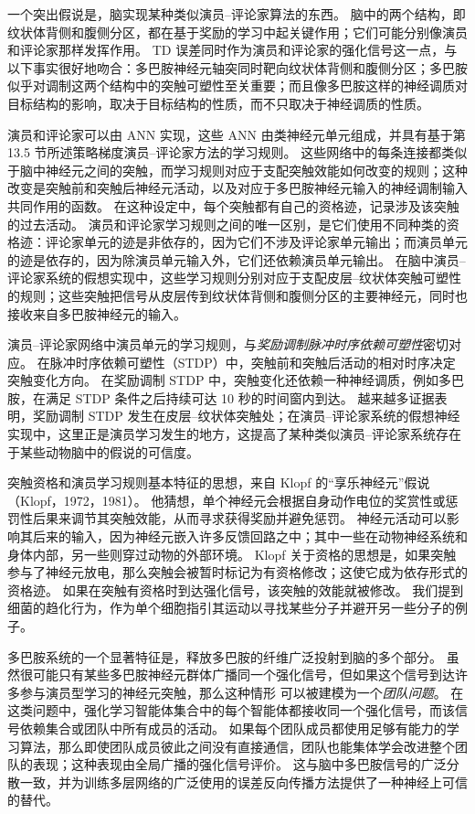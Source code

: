 \documentclass[UTF8,12pt,a4paper,fontset=fandol]{ctexart}
\begin{document}
一个突出假说是，脑实现某种类似演员--评论家算法的东西。
脑中的两个结构，即纹状体背侧和腹侧分区，都在基于奖励的学习中起关键作用；它们可能分别像演员和评论家那样发挥作用。
TD 误差同时作为演员和评论家的强化信号这一点，与以下事实很好地吻合：多巴胺神经元轴突同时靶向纹状体背侧和腹侧分区；多巴胺似乎对调制这两个结构中的突触可塑性至关重要；而且像多巴胺这样的神经调质对目标结构的影响，取决于目标结构的性质，而不只取决于神经调质的性质。

演员和评论家可以由 ANN 实现，这些 ANN 由类神经元单元组成，并具有基于第 13.5 节所述策略梯度演员--评论家方法的学习规则。
这些网络中的每条连接都类似于脑中神经元之间的突触，而学习规则对应于支配突触效能如何改变的规则；这种改变是突触前和突触后神经元活动，以及对应于多巴胺神经元输入的神经调制输入共同作用的函数。
在这种设定中，每个突触都有自己的资格迹，记录涉及该突触的过去活动。
演员和评论家学习规则之间的唯一区别，是它们使用不同种类的资格迹：评论家单元的迹是非依存的，因为它们不涉及评论家单元输出；而演员单元的迹是依存的，因为除演员单元输入外，它们还依赖演员单元输出。
在脑中演员--评论家系统的假想实现中，这些学习规则分别对应于支配皮层--纹状体突触可塑性的规则；这些突触把信号从皮层传到纹状体背侧和腹侧分区的主要神经元，同时也接收来自多巴胺神经元的输入。

演员--评论家网络中演员单元的学习规则，与\textit{奖励调制脉冲时序依赖可塑性}密切对应。
在脉冲时序依赖可塑性（STDP）中，突触前和突触后活动的相对时序决定突触变化方向。
在奖励调制 STDP 中，突触变化还依赖一种神经调质，例如多巴胺，在满足 STDP 条件之后持续可达 10 秒的时间窗内到达。
越来越多证据表明，奖励调制 STDP 发生在皮层--纹状体突触处；在演员--评论家系统的假想神经实现中，这里正是演员学习发生的地方，这提高了某种类似演员--评论家系统存在于某些动物脑中的假说的可信度。

突触资格和演员学习规则基本特征的思想，来自 Klopf 的“享乐神经元”假说（Klopf，1972，1981）。
他猜想，单个神经元会根据自身动作电位的奖赏性或惩罚性后果来调节其突触效能，从而寻求获得奖励并避免惩罚。
神经元活动可以影响其后来的输入，因为神经元嵌入许多反馈回路之中；其中一些在动物神经系统和身体内部，另一些则穿过动物的外部环境。
Klopf 关于资格的思想是，如果突触参与了神经元放电，那么突触会被暂时标记为有资格修改；这使它成为依存形式的资格迹。
如果在突触有资格时到达强化信号，该突触的效能就被修改。
我们提到细菌的趋化行为，作为单个细胞指引其运动以寻找某些分子并避开另一些分子的例子。

多巴胺系统的一个显著特征是，释放多巴胺的纤维广泛投射到脑的多个部分。
虽然很可能只有某些多巴胺神经元群体广播同一个强化信号，但如果这个信号到达许多参与演员型学习的神经元突触，那么这种情形
可以被建模为一个\textit{团队问题}。
在这类问题中，强化学习智能体集合中的每个智能体都接收同一个强化信号，而该信号依赖集合或团队中所有成员的活动。
如果每个团队成员都使用足够有能力的学习算法，那么即使团队成员彼此之间没有直接通信，团队也能集体学会改进整个团队的表现；这种表现由全局广播的强化信号评价。
这与脑中多巴胺信号的广泛分散一致，并为训练多层网络的广泛使用的误差反向传播方法提供了一种神经上可信的替代。
\end{document}
